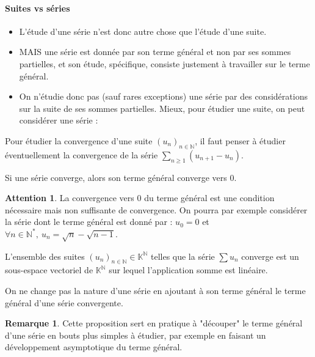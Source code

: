 \documentclass[french]{article}
\newcommand{\N}{\mathbb{N}}
\newcommand{\K}{\mathbb{K}}
\newcommand{\st}{^*}
\theoremstyle{plain}
\theoremstyle{definition}
\newtheorem*{rmq}{Remarque}
\newtheorem*{attention}{Attention}
\theoremstyle{remark}
\begin{document}
\paragraph{Suites vs séries}
\begin{itemize}
	\item L'étude d'une série n'est donc autre chose que l'étude d'une suite.
	\item MAIS une série est donnée par son terme général et non par ses sommes partielles, et son étude, spécifique, consiste justement à travailler sur le terme général.
	\item On n'étudie donc pas (sauf rares exceptions) une série par des considérations sur la suite de ses sommes partielles. Mieux, pour étudier une suite, on peut considérer une série :
\end{itemize}

\begin{met}
	Pour étudier la convergence d'une suite $(u_n)_{n\in\N}$, il faut penser à étudier éventuellement la convergence de la série $\displaystyle\sum_{n\geqslant 1}(u_{n+1}-u_n)$.
\end{met}

\begin{prop}%
	Si une série converge, alors son terme général converge vers $0$.
\end{prop}

\begin{attention}
	La convergence vers $0$ du terme général est une condition nécessaire mais non suffisante de convergence. On pourra par exemple considérer la série dont le terme général est donné par : $u_0=0$ et $\forall n\in\N\st,\ u_n=\sqrt{n}-\sqrt{n-1}$.
\end{attention}

\begin{prop}%
	L'ensemble des suites $(u_n)_{n\in\N}\in\K^\N$ telles que la série $\displaystyle\sum u_n$ converge est un sous-espace vectoriel de $\K^\N$ sur lequel l'application somme est linéaire.
\end{prop}

\begin{cor}%
	On ne change pas la nature d'une série en ajoutant à son terme général le terme général d'une série convergente.
\end{cor}

\begin{rmq}
	Cette proposition sert en pratique à "découper" le terme général d'une série en bouts plus simples à étudier, par exemple en faisant un développement asymptotique du terme général.
\end{rmq}
\end{document}
